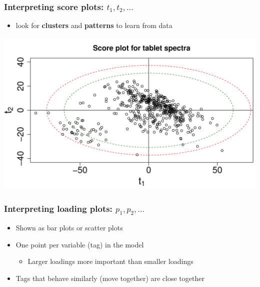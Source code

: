 \begin{frame}\frametitle{Interpreting score plots: \(t_1, t_2, \ldots \)}

\begin{itemize}
	\item	look for \textbf{clusters} and \textbf{patterns} to learn from data
\end{itemize}

\begin{center}
	\includegraphics[width=\textwidth]{images/spectral-data-t1-t2-scoreplot.png}
\end{center}
\end{frame}


\begin{frame}\frametitle{Interpreting loading plots: \( p_1, p_2, \ldots \)}

\begin{itemize}
	
	\item	Shown as bar plots or scatter plots

	\item 	One point per variable (tag) in the model
	
			\begin{itemize}
				
				\item	Larger loadings more important than smaller loadings
				
			\end{itemize}

	\item 	Tags that behave similarly (move together) are close together 
	
\end{itemize}
\end{frame}


